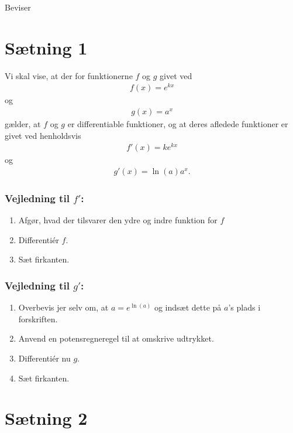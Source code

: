 \begin{center}
\Huge
Beviser
\end{center}
\section*{Sætning 1}

Vi skal vise, at der for funktionerne $f$ og $g$ givet ved
\begin{align*}
	f(x) = e^{kx}
\end{align*}
og 
\begin{align*}
	g(x) = a^x
\end{align*}
gælder, at $f$ og $g$ er differentiable funktioner, og at deres afledede funktioner er givet ved henholdsvis
\begin{align*}
	f'(x) = ke^{kx}
\end{align*}
og 
\begin{align*}
	g'(x) = \ln(a)a^x.
\end{align*}
\subsubsection*{Vejledning til $f'$:}
\begin{enumerate}[label = \roman*)]
	\item Afgør, hvad der tilsvarer den ydre og indre funktion for $f$
	\item Differentiér $f$. 
	\item Sæt firkanten.
\end{enumerate}

\subsubsection*{Vejledning til $g'$:}
\begin{enumerate}[label=\roman*)]
	\item Overbevis jer selv om, at $a = e^{\ln(a)}$ og indsæt dette på $a$'s plads i forskriften. 
	\item Anvend en potensregneregel til at omskrive udtrykket.
	\item Differentiér nu $g$.
	\item Sæt firkanten.
\end{enumerate}

\newpage
\section*{Sætning 2}

